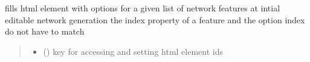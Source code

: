 \documentclass[letterpaper,10pt,english]{sphinxmanual}
\begin{document}
\begin{fulllineitems}
\label{\detokenize{docs_gui/js_api/network_editor/display_editable_network_features:populateLists}}
\pysigstartsignatures
{}
\pysigstopsignatures
\sphinxAtStartPar
fills html element with options for a given list of network features at intial editable network generation
the index property of a feature and the option index do not have to match
\begin{quote}\begin{description}
\begin{itemize}
\item {} 
\sphinxAtStartPar
{} () \textendash{} key for accessing and setting html element ids

\end{itemize}

\end{description}\end{quote}

\end{fulllineitems}

\end{document}

